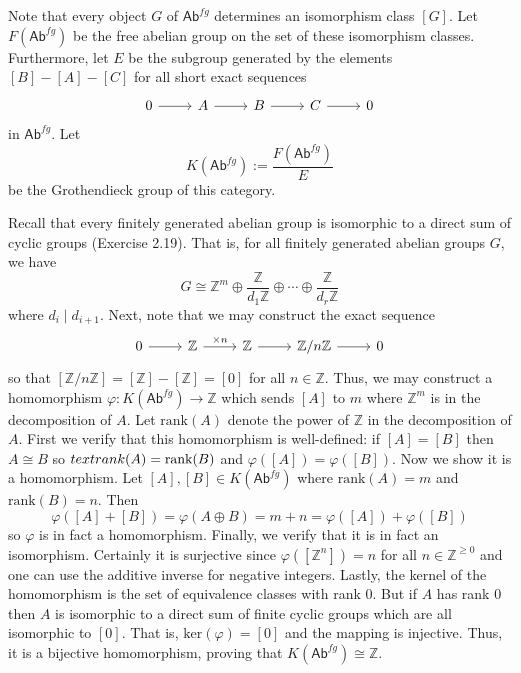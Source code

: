 \documentclass[../../master.tex]{subfiles}
\begin{document}
\begin{solution}
    Note that every object $G$ of $\mathsf{Ab}^{fg}$ determines an isomorphism class $[G]$.
    Let $F(\mathsf{Ab}^{fg})$ be the free abelian group on the set of these isomorphism classes.
    Furthermore, let $E$ be the subgroup generated by the elements $[B] - [A] - [C]$ for all short exact sequences
    \[
    \begin{tikzcd}
        0 & A & B & C & 0
        \arrow[from=1-1, to=1-2] 
        \arrow[from=1-2, to=1-3]
        \arrow[from=1-3, to=1-4]
        \arrow[from=1-4, to=1-5] 
    \end{tikzcd}
    \]
    in $\mathsf{Ab}^{fg}$.
    Let
    \[
        K(\mathsf{Ab}^{fg}) := \frac{F(\mathsf{Ab}^{fg})}{E}
    \]
    be the Grothendieck group of this category.

    Recall that every finitely generated abelian group is isomorphic to a direct sum of cyclic groups (Exercise 2.19).
    That is, for all finitely generated abelian groups $G$, we have
    \[
        G \cong \mathbb{Z}^{m} \oplus \frac{\mathbb{Z}}{d_1\mathbb{Z}} \oplus \cdots \oplus \frac{\mathbb{Z}}{d_r \mathbb{Z}}
    \]
    where $d_i \mid d_{i+1}$.
    Next, note that we may construct the exact sequence
    \[
    \begin{tikzcd}
        0 & \mathbb{Z} & \mathbb{Z} & \mathbb{Z} / n \mathbb{Z} & 0
        \arrow[from=1-1, to=1-2]
        \arrow[from=1-2, to=1-3, "\times n"]
        \arrow[from=1-3, to=1-4]
        \arrow[from=1-4, to=1-5] 
    \end{tikzcd}
    \]
    so that $[\mathbb{Z} / n\mathbb{Z}] = [\mathbb{Z}] - [\mathbb{Z}] = [0]$ for all $n \in \mathbb{Z}$.
    Thus, we may construct a homomorphism $\varphi: K(\mathsf{Ab}^{fg}) \to \mathbb{Z}$ which sends $[A]$ to $m$ where $\mathbb{Z}^{m}$ is in the decomposition of $A$.
    Let $\text{rank}(A)$ denote the power of $\mathbb{Z}$ in the decomposition of $A$.
    First we verify that this homomorphism is well-defined:
    if $[A] = [B]$ then $A \cong B$ so $\\text{rank}(A) = \text{rank}(B)$ and $\varphi([A]) = \varphi([B])$.
    Now we show it is a homomorphism.
    Let $[A], [B] \in K(\mathsf{Ab}^{fg})$ where $\text{rank}(A) = m$ and $\text{rank}(B) = n$.
    Then
    \[
        \varphi([A] + [B]) = \varphi(A \oplus B) = m + n = \varphi([A]) + \varphi([B])
    \]
    so $\varphi$ is in fact a homomorphism.
    Finally, we verify that it is in fact an isomorphism.
    Certainly it is surjective since $\varphi([\mathbb{Z}^{n}]) = n$ for all $n \in \mathbb{Z}^{\geq 0}$ and one can use the additive inverse for negative integers.
    Lastly, the kernel of the homomorphism is the set of equivalence classes with rank 0.
    But if $A$ has rank 0 then $A$ is isomorphic to a direct sum of finite cyclic groups which are all isomorphic to $[0]$.
    That is, $\text{ker}(\varphi) = [0]$ and the mapping is injective.
    Thus, it is a bijective homomorphism, proving that $K(\mathsf{Ab}^{fg}) \cong \mathbb{Z}$.
\end{solution}
\end{document}
